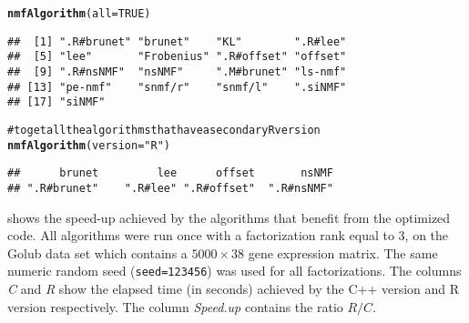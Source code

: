 \documentclass[a4paper]{article}\usepackage{graphicx, color}
\makeatletter
\newcommand{\hlfunctioncall}[1]{\textcolor[rgb]{0.501960784313725,0,0.329411764705882}{\textbf{#1}}}%
\newcommand{\hlstring}[1]{\textcolor[rgb]{0.6,0.6,1}{#1}}%
\newcommand{\hlcomment}[1]{\textcolor[rgb]{0.180392156862745,0.6,0.341176470588235}{#1}}%
\newenvironment{kframe}{%
 \def\at@end@of@kframe{}%
 \ifinner\ifhmode%
  \def\at@end@of@kframe{\end{minipage}}%
  \begin{minipage}{\columnwidth}%
 \fi\fi%
 \def\FrameCommand##1{\hskip\@totalleftmargin \hskip-\fboxsep
 \colorbox{shadecolor}{##1}\hskip-\fboxsep
     \hskip-\linewidth \hskip-\@totalleftmargin \hskip\columnwidth}%
 \MakeFramed {\advance\hsize-\width
   \@totalleftmargin\z@ \linewidth\hsize
   \@setminipage}}%
 {\par\unskip\endMakeFramed%
 \at@end@of@kframe}
\newenvironment{knitrout}{}{} %
\let\code=\texttt
\makeatother
\begin{document}
\begin{knitrout}
\color{fgcolor}\begin{kframe}
\begin{alltt}
\hlfunctioncall{nmfAlgorithm}(all = TRUE)
\end{alltt}
\begin{verbatim}
##  [1] ".R#brunet" "brunet"    "KL"        ".R#lee"   
##  [5] "lee"       "Frobenius" ".R#offset" "offset"   
##  [9] ".R#nsNMF"  "nsNMF"     ".M#brunet" "ls-nmf"   
## [13] "pe-nmf"    "snmf/r"    "snmf/l"    ".siNMF"   
## [17] "siNMF"
\end{verbatim}
\begin{alltt}

\hlcomment{# to get all the algorithms that have a secondary R version}
\hlfunctioncall{nmfAlgorithm}(version = \hlstring{"R"})
\end{alltt}
\begin{verbatim}
##      brunet         lee      offset       nsNMF 
## ".R#brunet"    ".R#lee" ".R#offset"  ".R#nsNMF"
\end{verbatim}
\end{kframe}
\end{knitrout}


 shows the speed-up achieved by the algorithms that benefit from the optimized code.
All algorithms were run once with a factorization rank equal to 3, on the Golub data set which contains a $5000\times 38$ gene expression matrix. 
The same numeric random seed (\code{seed=123456}) was used for all factorizations.
The columns \emph{C} and \emph{R} show the elapsed time (in seconds) achieved by the C++ version and R version respectively.
The column \emph{Speed.up} contains the ratio $R/C$. 
\end{document}
